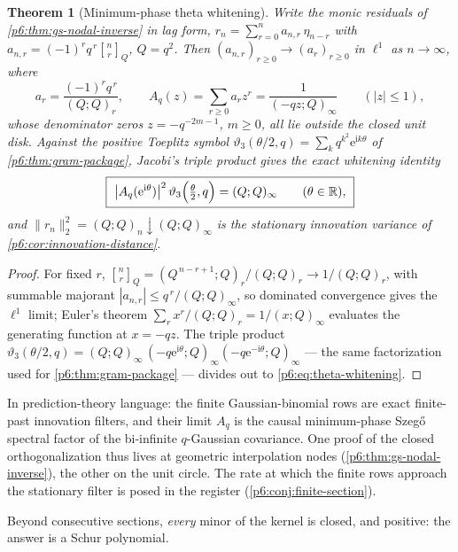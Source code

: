 \documentclass[11pt,oneside]{article}
\numberwithin{equation}{section}
\newtheorem{theorem}{Theorem}[section]
\theoremstyle{definition}
\theoremstyle{remark}
\newcommand{\R}{\mathbb R}
\newcommand{\e}{\mathrm e}
\newcommand{\ii}{\mathrm i}
\newcommand{\qbinom}[3]{\genfrac{[}{]}{0pt}{}{#1}{#2}_{#3}}
\begin{document}
\begin{theorem}[Minimum-phase theta whitening]\label{p6:thm:theta-whitening}
Write the monic residuals of \cref{p6:thm:gs-nodal-inverse} in lag form,
$r_n=\sum_{r=0}^{n}a_{n,r}\,\eta_{n-r}$ with
$a_{n,r}=(-1)^rq^{\,r}\qbinom{n}{r}{Q}$, $Q=q^2$.  Then
$(a_{n,r})_{r\ge0}\to(a_r)_{r\ge0}$ in $\ell^1$ as $n\to\infty$, where
\[
 a_r=\frac{(-1)^rq^{\,r}}{(Q;Q)_r},
 \qquad
 A_q(z)=\sum_{r\ge0}a_rz^r=\frac1{(-qz;Q)_\infty}
 \qquad(|z|\le1),
\]
whose denominator zeros $z=-q^{-2m-1}$, $m\ge0$, all lie outside the
closed unit disk.  Against the positive Toeplitz symbol
$\vartheta_3(\theta/2,q)=\sum_kq^{k^2}\e^{\ii k\theta}$ of
\cref{p6:thm:gram-package}, Jacobi's triple product gives the exact
whitening identity
\begin{equation}\label{p6:eq:theta-whitening}
 \boxed{\ \bigl|A_q(\e^{\ii\theta})\bigr|^2\,
 \vartheta_3\Bigl(\tfrac\theta2,q\Bigr)=(Q;Q)_\infty
 \qquad(\theta\in\R),\ }
\end{equation}
and $\|r_n\|_2^2=(Q;Q)_n\downarrow(Q;Q)_\infty$ is the stationary
innovation variance of \cref{p6:cor:innovation-distance}.
\end{theorem}

\begin{proof}
For fixed $r$,
$\qbinom{n}{r}{Q}=(Q^{\,n-r+1};Q)_r/(Q;Q)_r\to1/(Q;Q)_r$, with summable
majorant $|a_{n,r}|\le q^{\,r}/(Q;Q)_\infty$, so dominated convergence
gives the $\ell^1$ limit; Euler's theorem
$\sum_rx^r/(Q;Q)_r=1/(x;Q)_\infty$ evaluates the generating function at
$x=-qz$.  The triple product
$\vartheta_3(\theta/2,q)
=(Q;Q)_\infty\,(-q\e^{\ii\theta};Q)_\infty(-q\e^{-\ii\theta};Q)_\infty$
--- the same factorization used for \cref{p6:thm:gram-package} --- divides
out to \eqref{p6:eq:theta-whitening}.
\end{proof}

In prediction-theory language: the finite Gaussian-binomial rows are exact
finite-past innovation filters, and their limit $A_q$ is the causal
minimum-phase Szeg\H{o} spectral factor of the bi-infinite $q$-Gaussian
covariance.  One proof of the closed orthogonalization thus lives at
geometric interpolation nodes (\cref{p6:thm:gs-nodal-inverse}), the other
on the unit circle.  The rate at which the finite rows approach the
stationary filter is posed in the register
(\cref{p6:conj:finite-section}).

Beyond consecutive sections, \emph{every} minor of the kernel is closed,
and positive: the answer is a Schur polynomial.
\end{document}
